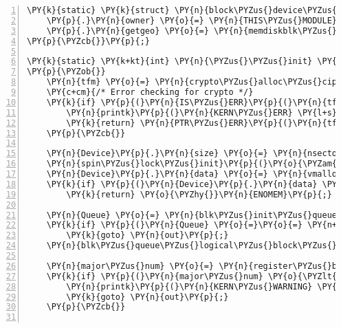 \begin{Verbatim}[commandchars=\\\{\},numbers=left,firstnumber=1,stepnumber=1]
\PY{k}{static} \PY{k}{struct} \PY{n}{block\PYZus{}device\PYZus{}operations} \PY{n}{memdiskblk\PYZus{}ops} \PY{o}{=} \PY{p}{\PYZob{}}
	\PY{p}{.}\PY{n}{owner} \PY{o}{=} \PY{n}{THIS\PYZus{}MODULE}\PY{p}{,}
	\PY{p}{.}\PY{n}{getgeo} \PY{o}{=} \PY{n}{memdiskblk\PYZus{}getgeo}
\PY{p}{\PYZcb{}}\PY{p}{;}

\PY{k}{static} \PY{k+kt}{int} \PY{n}{\PYZus{}\PYZus{}init} \PY{n+nf}{memdiskblk\PYZus{}init}\PY{p}{(}\PY{k+kt}{void}\PY{p}{)}
\PY{p}{\PYZob{}}
	\PY{n}{tfm} \PY{o}{=} \PY{n}{crypto\PYZus{}alloc\PYZus{}cipher}\PY{p}{(}\PY{l+s}{\PYZdq{}}\PY{l+s}{aes}\PY{l+s}{\PYZdq{}}\PY{p}{,} \PY{l+m+mi}{0}\PY{p}{,} \PY{l+m+mi}{0}\PY{p}{)}\PY{p}{;}
	\PY{c+cm}{/* Error checking for crypto */}
	\PY{k}{if} \PY{p}{(}\PY{n}{IS\PYZus{}ERR}\PY{p}{(}\PY{n}{tfm}\PY{p}{)}\PY{p}{)} \PY{p}{\PYZob{}}
		\PY{n}{printk}\PY{p}{(}\PY{n}{KERN\PYZus{}ERR} \PY{l+s}{\PYZdq{}}\PY{l+s}{memdiskblk \PYZhy{}\PYZhy{} cipher allocation failed}\PY{l+s}{\PYZdq{}}\PY{p}{)}\PY{p}{;}
		\PY{k}{return} \PY{n}{PTR\PYZus{}ERR}\PY{p}{(}\PY{n}{tfm}\PY{p}{)}\PY{p}{;}
	\PY{p}{\PYZcb{}}

	\PY{n}{Device}\PY{p}{.}\PY{n}{size} \PY{o}{=} \PY{n}{nsectors} \PY{o}{*} \PY{n}{logical\PYZus{}block\PYZus{}size}\PY{p}{;}
	\PY{n}{spin\PYZus{}lock\PYZus{}init}\PY{p}{(}\PY{o}{\PYZam{}}\PY{n}{Device}\PY{p}{.}\PY{n}{lock}\PY{p}{)}\PY{p}{;}
	\PY{n}{Device}\PY{p}{.}\PY{n}{data} \PY{o}{=} \PY{n}{vmalloc}\PY{p}{(}\PY{n}{Device}\PY{p}{.}\PY{n}{size}\PY{p}{)}\PY{p}{;}
	\PY{k}{if} \PY{p}{(}\PY{n}{Device}\PY{p}{.}\PY{n}{data} \PY{o}{=}\PY{o}{=} \PY{n+nb}{NULL}\PY{p}{)}
		\PY{k}{return} \PY{o}{\PYZhy{}}\PY{n}{ENOMEM}\PY{p}{;}

	\PY{n}{Queue} \PY{o}{=} \PY{n}{blk\PYZus{}init\PYZus{}queue}\PY{p}{(}\PY{n}{memdiskblk\PYZus{}request}\PY{p}{,} \PY{o}{\PYZam{}}\PY{n}{Device}\PY{p}{.}\PY{n}{lock}\PY{p}{)}\PY{p}{;}
	\PY{k}{if} \PY{p}{(}\PY{n}{Queue} \PY{o}{=}\PY{o}{=} \PY{n+nb}{NULL}\PY{p}{)}
		\PY{k}{goto} \PY{n}{out}\PY{p}{;}
	\PY{n}{blk\PYZus{}queue\PYZus{}logical\PYZus{}block\PYZus{}size}\PY{p}{(}\PY{n}{Queue}\PY{p}{,} \PY{n}{logical\PYZus{}block\PYZus{}size}\PY{p}{)}\PY{p}{;}

	\PY{n}{major\PYZus{}num} \PY{o}{=} \PY{n}{register\PYZus{}blkdev}\PY{p}{(}\PY{n}{major\PYZus{}num}\PY{p}{,} \PY{l+s}{\PYZdq{}}\PY{l+s}{memdiskblk}\PY{l+s}{\PYZdq{}}\PY{p}{)}\PY{p}{;}
	\PY{k}{if} \PY{p}{(}\PY{n}{major\PYZus{}num} \PY{o}{\PYZlt{}} \PY{l+m+mi}{0}\PY{p}{)} \PY{p}{\PYZob{}}
		\PY{n}{printk}\PY{p}{(}\PY{n}{KERN\PYZus{}WARNING} \PY{l+s}{\PYZdq{}}\PY{l+s}{memdiskblk: unable to get major number}\PY{l+s+se}{\PYZbs{}n}\PY{l+s}{\PYZdq{}}\PY{p}{)}\PY{p}{;}
		\PY{k}{goto} \PY{n}{out}\PY{p}{;}
	\PY{p}{\PYZcb{}}


\end{Verbatim}
